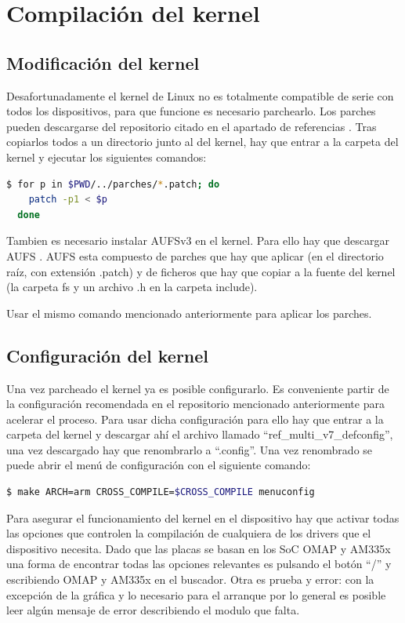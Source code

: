 \documentclass{tfg}
\begin{document}
\section{Compilación del kernel}
\subsection{Modificación del kernel}
Desafortunadamente el kernel de Linux no es totalmente compatible de serie con todos los dispositivos, para que funcione
es necesario parchearlo. Los parches pueden descargarse del repositorio citado en el apartado de referencias \cite{robcnelson}. Tras
copiarlos todos a un directorio junto al del kernel, hay que entrar a la carpeta del kernel y ejecutar los siguientes
comandos:
\begin{lstlisting}[language=bash,caption=Aplicacion de parches del kernel]
$ for p in $PWD/../parches/*.patch; do
    patch -p1 < $p
  done
\end{lstlisting}
%

Tambien es necesario instalar AUFSv3 en el kernel. Para ello hay que descargar AUFS \cite{aufs}. AUFS esta compuesto de parches que hay que aplicar (en el directorio raíz, con extensión .patch) y de ficheros que hay que copiar a la fuente del kernel (la carpeta fs y un archivo .h en la carpeta include).

Usar el mismo comando mencionado anteriormente para aplicar los parches.

\subsection{Configuración del kernel}
Una vez parcheado el kernel ya es posible configurarlo. Es conveniente partir de la configuración recomendada en el 
repositorio mencionado anteriormente para acelerar el proceso. Para usar dicha configuración para ello hay que entrar a
la carpeta del kernel y descargar ahí el archivo llamado ``ref\_multi\_v7\_defconfig'', una vez descargado hay que
renombrarlo a ``.config''. Una vez renombrado se puede abrir el menú de configuración con el siguiente comando:

\begin{lstlisting}[language=bash,caption=Configuración del kernel]
$ make ARCH=arm CROSS_COMPILE=$CROSS_COMPILE menuconfig
\end{lstlisting}

Para asegurar el funcionamiento del kernel en el dispositivo hay que activar todas las opciones que controlen la
compilación de cualquiera de los drivers que el dispositivo necesita. Dado que las placas se basan en los SoC OMAP y AM335x una
forma de encontrar todas las opciones relevantes es pulsando el botón ``/'' y escribiendo OMAP y AM335x en el buscador. Otra es prueba y error: con la excepción de la gráfica y lo necesario para el arranque por lo general es posible leer algún mensaje de error describiendo el modulo que falta.
\end{document}
